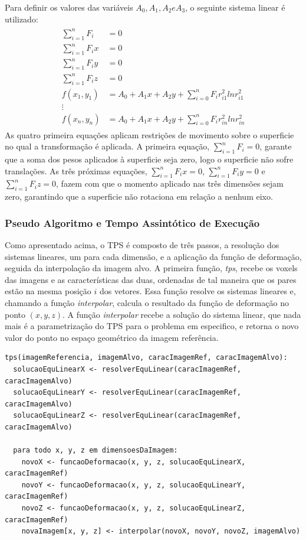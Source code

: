 Para definir os valores das variáveis $A_0, A_1, A_2 e A_3$, o seguinte sistema
linear é utilizado:
\begin{align}
\begin{split}
    \sum_{i=1}^n F_i &= 0 \\
    \sum_{i=1}^n F_ix &= 0 \\
    \sum_{i=1}^n F_iy &= 0 \\
    \sum_{i=1}^n F_iz &= 0 \\
    f(x_1,y_1) &= A_0 + A_1x + A_2y + \sum_{i=0}^n F_i r_{i1}^2 ln r_{i1}^2 \\
    \vdots \\
    f(x_n,y_n) &= A_0 + A_1x + A_2y + \sum_{i=0}^n F_i r_{in}^2 ln r_{in}^2
\end{split}
\end{align}
  As quatro primeira equações aplicam restrições de movimento sobre o superficie no qual
a transformação é aplicada. A primeira equação, $\sum_{i=1}^n F_i = 0$, garante que
a soma dos pesos aplicados à superficie seja zero, logo o superficie não sofre translações.
As três próximas equações, $\sum_{i=1}^n F_ix = 0$, $\sum_{i=1}^n F_iy = 0$ e
$\sum_{i=1}^n F_iz = 0$, fazem com que o momento aplicado nas três dimensões sejam
zero, garantindo que a superficie não rotaciona em relação a nenhum eixo.

\subsubsection{Pseudo Algoritmo e Tempo Assintótico de Execução}

  Como apresentado acima, o TPS é composto de três passos, a resolução
dos sistemas lineares, um para cada dimensão, e a aplicação da função de
deformação, seguida da interpolação da imagem alvo.
A primeira função, \textit{tps}, recebe os voxels das imagens e as características
das duas, ordenadas de tal maneira que os pares estão na mesma posição $i$ dos
vetores. Essa função resolve os sistemas lineares e, chamando a função
\textit{interpolar}, calcula o resultado da função de deformação no ponto
$(x, y, z)$. A função \textit{interpolar} recebe a solução do sistema linear,
que nada mais é a parametrização do TPS para o problema em especifico, e retorna
o novo valor do ponto no espaço geométrico da imagem referência.

\begin{lstlisting}[mathescape]
tps(imagemReferencia, imagemAlvo, caracImagemRef, caracImagemAlvo):
  solucaoEquLinearX <- resolverEquLinear(caracImagemRef, caracImagemAlvo)
  solucaoEquLinearY <- resolverEquLinear(caracImagemRef, caracImagemAlvo)
  solucaoEquLinearZ <- resolverEquLinear(caracImagemRef, caracImagemAlvo)

  para todo x, y, z em dimensoesDaImagem:
    novoX <- funcaoDeformacao(x, y, z, solucaoEquLinearX, caracImagemRef)
    novoY <- funcaoDeformacao(x, y, z, solucaoEquLinearY, caracImagemRef)
    novoZ <- funcaoDeformacao(x, y, z, solucaoEquLinearZ, caracImagemRef)
    novaImagem[x, y, z] <- interpolar(novoX, novoY, novoZ, imagemAlvo)
\end{lstlisting}

